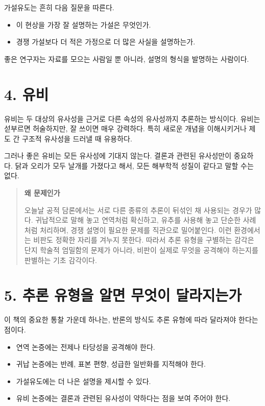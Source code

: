 가설유도는 흔히 다음 질문을 따른다.

\begin{itemize}
\tightlist
\item
  이 현상을 가장 잘 설명하는 가설은 무엇인가.
\item
  경쟁 가설보다 더 적은 가정으로 더 많은 사실을 설명하는가.
\end{itemize}

좋은 연구자는 자료를 모으는 사람일 뿐 아니라, 설명의 형식을 발명하는 사람이다.

\section{4. 유비}\label{4-uxc720uxbe44}

유비는 두 대상의 유사성을 근거로 다른 속성의 유사성까지 추론하는 방식이다. 유비는 섣부르면 허술하지만, 잘 쓰이면 매우 강력하다. 특히 새로운 개념을 이해시키거나 제도 간 구조적 유사성을 드러낼 때 유용하다.

그러나 좋은 유비는 모든 유사성에 기대지 않는다. 결론과 관련된 유사성만이 중요하다. 닭과 오리가 모두 날개를 가졌다고 해서, 모든 해부학적 성질이 같다고 말할 수는 없다.

\begin{quote}
\textbf{왜 문제인가}

오늘날 공적 담론에서는 서로 다른 종류의 추론이 뒤섞인 채 사용되는 경우가 많다. 귀납적으로 말해 놓고 연역처럼 확신하고, 유추를 사용해 놓고 단순한 사례처럼 처리하며, 경쟁 설명이 필요한 문제를 직관으로 밀어붙인다. 이런 환경에서는 비판도 정확한 자리를 겨누지 못한다. 따라서 추론 유형을 구별하는 감각은 단지 학술적 엄밀함의 문제가 아니라, 비판이 실제로 무엇을 공격해야 하는지를 판별하는 기초 감각이다.
\end{quote}

\section{5. 추론 유형을 알면 무엇이 달라지는가}\label{5-uxcd94uxb860-uxc720uxd615uxc744-uxc54cuxba74-uxbb34uxc5c7uxc774-uxb2ecuxb77cuxc9c0uxb294uxac00}

이 책의 중요한 통찰 가운데 하나는, 반론의 방식도 추론 유형에 따라 달라져야 한다는 점이다.

\begin{itemize}
\tightlist
\item
  연역 논증에는 전제나 타당성을 공격해야 한다.
\item
  귀납 논증에는 반례, 표본 편향, 성급한 일반화를 지적해야 한다.
\item
  가설유도에는 더 나은 설명을 제시할 수 있다.
\item
  유비 논증에는 결론과 관련된 유사성이 약하다는 점을 보여 주어야 한다.
\end{itemize}

